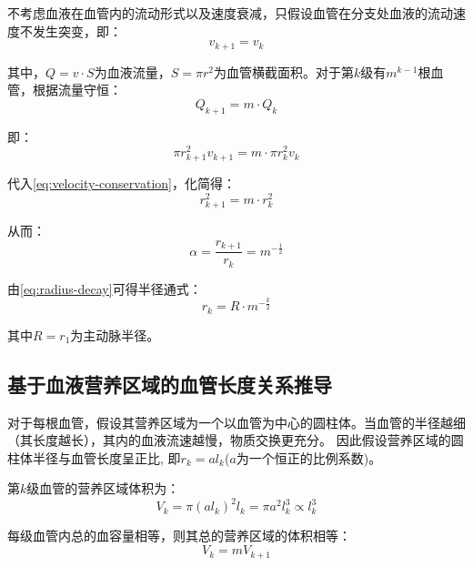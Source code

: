 不考虑血液在血管内的流动形式以及速度衰减，只假设血管在分支处血液的流动速度不发生突变，即：
\begin{equation}
v_{k+1} = v_k
\label{eq:velocity-conservation}
\end{equation}

其中，$Q = v \cdot S$为血液流量，$S = \pi r^2$为血管横截面积。对于第$k$级有$m^{k-1}$根血管，根据流量守恒：
\begin{equation}
Q_{k+1} = m \cdot Q_k
\label{eq:flow-multiple}
\end{equation}

即：
\begin{equation}
\pi r_{k+1}^2 v_{k+1} = m \cdot \pi r_k^2 v_k
\label{eq:flow-equation}
\end{equation}

代入\cref{eq:velocity-conservation}，化简得：
\begin{equation}
r_{k+1}^2 = m \cdot r_k^2
\end{equation}

从而：
\begin{equation}
\alpha = \frac{r_{k+1}}{r_k} = m^{-\frac{1}{2}}
\label{eq:radius-decay}
\end{equation}

由\cref{eq:radius-decay}可得半径通式：
\begin{equation}
r_k = R \cdot m^{-\frac{k}{2}}
\label{eq:radius-general}
\end{equation}

其中$R = r_1$为主动脉半径。

\subsection{基于血液营养区域的血管长度关系推导}

对于每根血管，假设其营养区域为一个以血管为中心的圆柱体。当血管的半径越细（其长度越长），其内的血液流速越慢，物质交换更充分。
因此假设营养区域的圆柱体半径与血管长度呈正比, 即$ r_k = a l_k$($a$为一个恒正的比例系数)。

第$k$级血管的营养区域体积为：
\begin{equation}
V_k = \pi \left( a l_k \right)^2 l_k = \pi a^2 l_k^3 \propto l_k^3
\label{eq:nutrient-volume}
\end{equation}

每级血管内总的血容量相等，则其总的营养区域的体积相等：
\begin{equation}
V_k = mV_{k+1}
\label{eq:volume-equal}
\end{equation}

